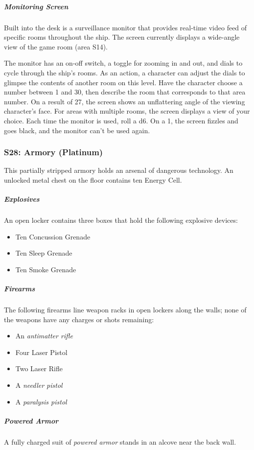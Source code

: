 \documentclass[10pt,a4paper,twoside,bg=print,twocolumn,openany,nodeprecatedcode]{dndbook}
\begin{document}
\subparagraph{Monitoring Screen}
Built into the desk is a surveillance monitor that provides real-time video feed of specific rooms throughout the ship. The screen currently displays a wide-angle view of the game room (area S14).

The monitor has an on-off switch, a toggle for zooming in and out, and dials to cycle through the ship's rooms. As an action, a character can adjust the dials to glimpse the contents of another room on this level. Have the character choose a number between 1 and 30, then describe the room that corresponds to that area number. On a result of 27, the screen shows an unflattering angle of the viewing character's face. For areas with multiple rooms, the screen displays a view of your choice. Each time the monitor is used, roll a d6. On a 1, the screen fizzles and goes black, and the monitor can't be used again.

\subsubsection{S28: Armory (Platinum)}
This partially stripped armory holds an arsenal of dangerous technology. An unlocked metal chest on the floor contains ten Energy Cell.

\subparagraph{Explosives}
An open locker contains three boxes that hold the following explosive devices:


\begin{itemize}
\item Ten Concussion Grenade
\item Ten Sleep Grenade
\item Ten Smoke Grenade
\end{itemize}

\subparagraph{Firearms}
The following firearms line weapon racks in open lockers along the walls; none of the weapons have any charges or shots remaining:


\begin{itemize}
\item An \textit{antimatter rifle}
\item Four Laser Pistol
\item Two Laser Rifle
\item A \textit{needler pistol}
\item A \textit{paralysis pistol}
\end{itemize}

\subparagraph{Powered Armor}
A fully charged suit of \textit{powered armor} stands in an alcove near the back wall.
\end{document}
